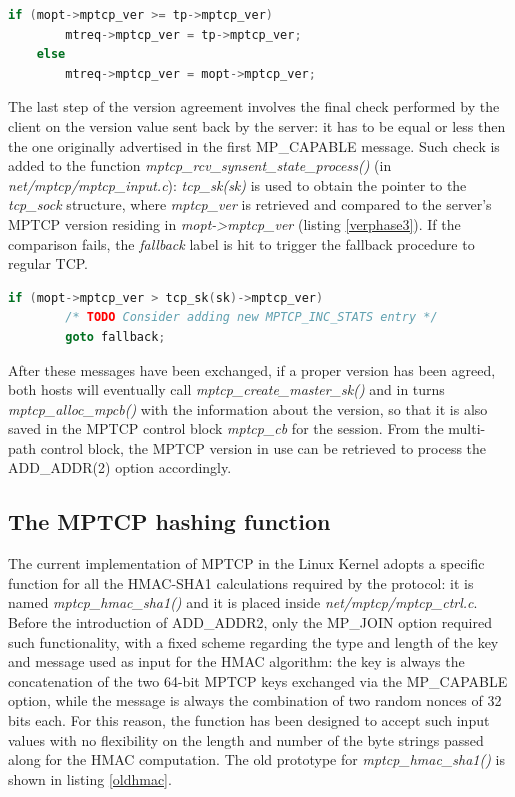 \begin{lstlisting}[language=c, caption=\textit{MPTCP version agreement, phase 2}, label=verphase2]
	if (mopt->mptcp_ver >= tp->mptcp_ver)
		mtreq->mptcp_ver = tp->mptcp_ver;
	else
		mtreq->mptcp_ver = mopt->mptcp_ver;
\end{lstlisting}

The last step of the version agreement involves the final check performed by the client on the version value sent back by the server: it has to be equal or less then the one originally advertised in the first MP\_CAPABLE message. Such check is added to the function \textit{mptcp\_rcv\_synsent\_state\_process()} (in \textit{net/mptcp/mptcp\_input.c}): \textit{tcp\_sk(sk)} is used to obtain the pointer to the \textit{tcp\_sock} structure, where \textit{mptcp\_ver} is retrieved and compared to the server's MPTCP version residing in \textit{mopt->mptcp\_ver} (listing \ref{verphase3}). If the comparison fails, the \textit{fallback} label is hit to trigger the fallback procedure to regular TCP.

\begin{lstlisting}[language=c, caption=\textit{MPTCP version agreement, phase 3}, label=verphase3]
	if (mopt->mptcp_ver > tcp_sk(sk)->mptcp_ver)
		/* TODO Consider adding new MPTCP_INC_STATS entry */
		goto fallback;
\end{lstlisting}

After these messages have been exchanged, if a proper version has been agreed, both hosts will eventually call \textit{mptcp\_create\_master\_sk()} and in turns \textit{mptcp\_alloc\_mpcb()} with the information about the version, so that it is also saved in the MPTCP control block \textit{mptcp\_cb} for the session. From the multi-path control block, the MPTCP version in use can be retrieved to process the ADD\_ADDR(2) option accordingly.

\subsection{The MPTCP hashing function}
\label{newhash}
The current implementation of MPTCP in the Linux Kernel adopts a specific function for all the HMAC-SHA1 calculations required by the protocol: it is named \textit{mptcp\_hmac\_sha1()} and it is placed inside \textit{net/mptcp/mptcp\_ctrl.c}. Before the introduction of ADD\_ADDR2, only the MP\_JOIN option required such functionality, with a fixed scheme regarding the type and length of the key and message used as input for the HMAC algorithm: the key is always the concatenation of the two 64-bit MPTCP keys exchanged via the MP\_CAPABLE option, while the message is always the combination of two random nonces of 32 bits each. For this reason, the function has been designed to accept such input values with no flexibility on the length and number of the byte strings passed along for the HMAC computation. The old prototype for \textit{mptcp\_hmac\_sha1()} is shown in listing \ref{oldhmac}.

